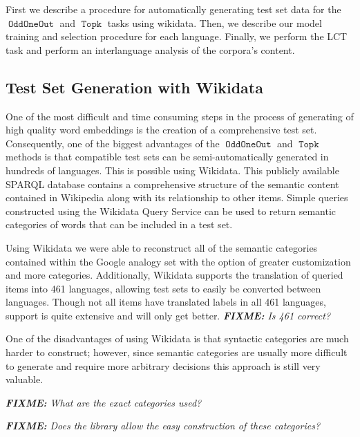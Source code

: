 \documentclass[11pt,a4paper]{article}
\DeclareMathOperator{\OddOneOut}{\texttt{OddOneOut}}
\DeclareMathOperator{\topk}{\texttt{Topk}}
\newcommand{\fixme}[1]{{\color{red}\itshape \textbf{FIXME:} {#1}}}
\begin{document}
First we describe a procedure for automatically generating test set data for the $\OddOneOut$ and $\topk$ tasks using wikidata.
Then, we describe our model training and selection procedure for each language.
Finally, we perform the LCT task and perform an interlanguage analysis of the corpora's content.

\subsection{Test Set Generation with Wikidata}

One of the most difficult and time consuming steps in the process of generating of high quality word embeddings is the creation of a comprehensive test set.
 Consequently, one of the biggest advantages of the $\OddOneOut$ and $\topk$ methods is that compatible test sets can be semi-automatically generated in hundreds of languages.
This is possible using Wikidata. 
This publicly available SPARQL database contains a comprehensive structure of the semantic content contained in Wikipedia
along with its relationship to other items.
Simple queries constructed using the Wikidata Query Service can be used to return semantic categories of words that can be included in a test set.

Using Wikidata we were able to reconstruct all of the semantic categories contained within the Google analogy set with the option of greater customization and more categories.
Additionally, Wikidata supports the translation of queried items into 461 languages, allowing test sets to easily be converted between languages.
Though not all items have translated labels in all 461 languages, support is quite extensive and will only get better. 
\fixme{Is 461 correct?}

One of the disadvantages of using Wikidata is that syntactic categories are much harder to construct;
however, since semantic categories are usually more difficult to generate 
and require more arbitrary decisions this approach is still very valuable.

\fixme{What are the exact categories used?}

\fixme{Does the library allow the easy construction of these categories?}
\end{document}
